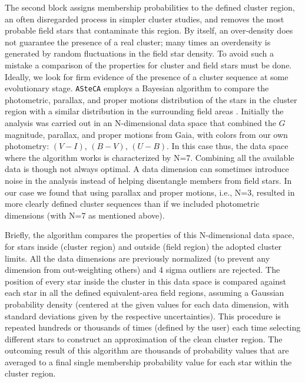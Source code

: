 \documentclass[draft]{aa}
\begin{document}
The second block assigns membership probabilities to the defined
cluster region, an often disregarded process in simpler cluster studies, 
and removes the most probable field stars that contaminate this region.
By itself, an over-density does not guarantee the presence of a real cluster;
many times an overdensity is generated by random fluctuations in the field star
density. To avoid such a mistake a comparison of the properties for cluster and
field stars must be done. Ideally, we look for firm evidence of the presence of
a cluster sequence at some evolutionary stage. \texttt{ASteCA} employs a
Bayesian algorithm to compare the photometric, parallax, and proper motions
distribution of the stars in the cluster region with a similar distribution in
the surrounding field areas \citep{Perren_2015}. Initially the analysis
was carried out in an N-dimensional data space that combined the
$G$ magnitude, parallax, and proper motions from Gaia, with colors from our own
photometry: $(V-I)$, $(B-V)$, $(U-B)$. In this case thus, the data space where
the algorithm works is characterized by N=7.
Combining all the available data is though not always optimal. A
data dimension can sometimes introduce noise in the analysis instead of helping
disentangle members from field stars. In our case we found that using
parallax and proper motions, i.e., N=3, resulted in more clearly defined
cluster sequences than if we included photometric dimensions (with N=7 as
mentioned above).

%
Briefly, the algorithm compares the properties of this N-dimensional data space,
for stars inside (cluster region) and outside (field region)
the adopted cluster limits. All the data dimensions are previously normalized 
(to prevent any dimension from out-weighting others) and 4 sigma outliers are
rejected.
The position of every star inside the cluster in this data space is compared
against each star in all the defined equivalent-area field regions,
assuming a Gaussian probability density (centered at the given values for each
data dimension, with standard deviations given by the respective
uncertainties). This procedure is repeated hundreds or thousands of times 
(defined by the user) each time selecting different stars to construct an
approximation of the clean cluster region. The outcoming result of this
algorithm are thousands of probability values that are averaged to a final
single membership probability value for each star within the cluster region.
\end{document}

